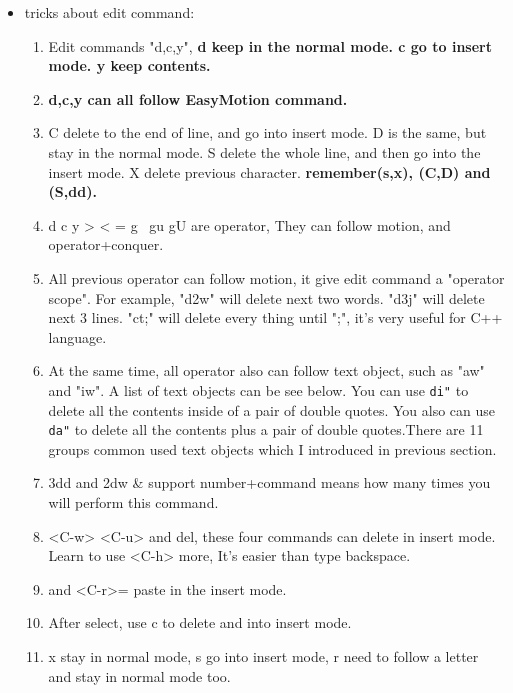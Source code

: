 \documentclass[a4paper,12pt,twoside]{book}
\begin{document}
\begin{itemize}
\item tricks about edit command: 
		\begin{enumerate} 
				\item  Edit commands "d,c,y", \textbf{d keep in the normal mode. c go to insert mode. y keep contents.} 

				\item \textbf{d,c,y can all follow EasyMotion command.}

				\item C delete to the end of line, and go into insert mode. D is the same, but stay in the normal mode. S delete the whole line, and then go into the insert mode. X delete previous character. \textbf{remember(s,x), (C,D) and (S,dd).}
						
				\item d c y > < = g~ gu gU are operator, They can follow motion, and operator+conquer.

				\item All previous operator can follow motion, it give edit command a "operator scope". For example, "d2w" will delete next two words. "d3j" will delete next 3 lines. "ct;" will delete every thing until ";", it's very useful for C++ language. 

				\item  At the same time, all operator also can follow text object, such as "aw" and "iw". A list of text objects can be see below.  You can use \verb=di"= to delete all the contents inside of a pair of double quotes. You also can use \verb=da"= to delete all the contents plus a pair of double quotes.There are 11 groups common used text objects which I introduced in previous section. 


				\item 3dd and 2dw   \& support number+command means how many times you will perform this command.

				\item <C-h> <C-w> <C-u> and del, these four commands can delete in insert mode. Learn to use <C-h> more, It's easier than type backspace.
					
				\item <C-r> and <C-r>= paste in the insert mode.

				\item After select, use c to delete and into insert mode.

				\item x stay in normal mode, s go into insert mode, r need to follow a letter and stay in normal mode too.
						

\end{enumerate}
\end{itemize}
\end{document}
